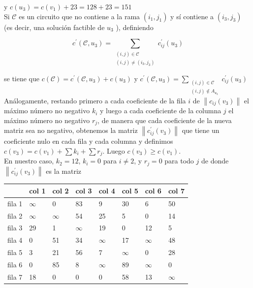 \documentclass[10pt]{article}
\begin{document}
y $c\left(u_{3}\right)=c\left(v_{1}\right)+23=128+23=151$\\
Si $\mathcal{C}$ es un circuito que no contiene a la rama $\left(i_{1}, j_{1}\right)$ y sí contiene a $\left(i_{3}, j_{3}\right)$ (es decir, una solución factible de $u_{3}$ ), definiendo

$$
c^{\prime}\left(\mathcal{C}, u_{3}\right)=\sum_{\substack{(i, j) \in \mathcal{C} \\(i, j) \neq\left(i_{3}, j_{3}\right)}} c_{i j}^{\prime}\left(u_{3}\right)
$$

se tiene que $c(\mathcal{C})=c^{\prime}\left(\mathcal{C}, u_{3}\right)+c\left(u_{3}\right)$ y $c^{\prime}\left(\mathcal{C}, u_{3}\right)=\sum_{\substack{(i, j) \in \mathcal{C} \\(i, j) \notin A_{u_{3}}}} c_{i j}^{\prime}\left(u_{3}\right)$\\
Análogamente, restando primero a cada coeficiente de la fila $i$ de $\left\|c_{i j}\left(v_{3}\right)\right\|$ el máximo número no negativo $k_{i}$ y luego a cada coeficiente de la columna $j$ el máximo número no negativo $r_{j}$, de manera que cada coeficiente de la nueva matriz sea no negativo, obtenemos la matriz $\left\|c_{i j}^{\prime}\left(v_{3}\right)\right\|$ que tiene un coeficiente nulo en cada fila y cada columna y definimos $c\left(v_{3}\right)=c\left(v_{1}\right)+\sum k_{i}+\sum r_{j}$. Luego $c\left(v_{3}\right) \geq c\left(v_{1}\right)$.\\
En nuestro caso, $k_{2}=12$, $k_{i}=0$ para $i \neq 2$, y $r_{j}=0$ para todo $j$ de donde $\left\|c_{i j}^{\prime}\left(v_{3}\right)\right\|$ es la matriz

\begin{center}
\begin{tabular}{|l|l|l|l|l|l|l|l|}
\hline
 & col 1 & col 2 & col 3 & col 4 & col 5 & col 6 & col 7 \\
\hline
fila 1 & $\infty$ & 0 & 83 & 9 & 30 & 6 & 50 \\
\hline
fila 2 & $\infty$ & $\infty$ & 54 & 25 & 5 & 0 & 14 \\
\hline
fila 3 & 29 & 1 & $\infty$ & 19 & 0 & 12 & 5 \\
\hline
fila 4 & 0 & 51 & 34 & $\infty$ & 17 & $\infty$ & 48 \\
\hline
fila 5 & 3 & 21 & 56 & 7 & $\infty$ & 0 & 28 \\
\hline
fila 6 & 0 & 85 & 8 & $\infty$ & 89 & $\infty$ & 0 \\
\hline
fila 7 & 18 & 0 & 0 & 0 & 58 & 13 & $\infty$ \\
\hline
\end{tabular}
\end{center}
\end{document}
